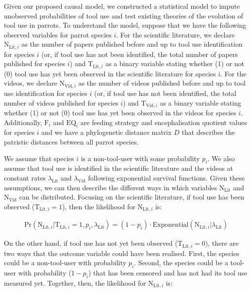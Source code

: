 \documentclass[
  man, donotrepeattitle,floatsintext]{apa6}
\begin{document}
Given our proposed causal model, we constructed a statistical model to impute
unobserved probabilities of tool use and test existing theories of the evolution
of tool use in parrots. To understand the model, suppose that we have the
following observed variables for parrot species \(i\). For the scientific
literature, we declare \(\text{N}_{\text{Lit},i}\) as the number of papers
published before and up to tool use identification for species \(i\) (or, if tool
use has not been identified, the total number of papers published for species
\(i\)) and \(\text{T}_{\text{Lit},i}\) as a binary variable stating whether (1) or
not (0) tool use has yet been observed in the scientific literature for species
\(i\). For the videos, we declare \(\text{N}_{\text{Vid},i}\) as the
number of videos published before and up to tool use identification for species
\(i\) (or, if tool use has not been identified, the total number of videos
published for species \(i\)) and \(\text{T}_{\text{Vid},i}\) as a binary variable
stating whether (1) or not (0) tool use has yet been observed in the
videos for species \(i\). Additionally, \(\text{F}_i\) and
\(\text{EQ}_i\) are feeding strategy and encephalisation quotient values for
species \(i\) and we have a phylogenetic distance matrix \(D\) that describes the
patristic distances between all parrot species.

We assume that species \(i\) is a non-tool-user with some
probability \(p_i\). We also assume that tool use is identified in the scientific
literature and the videos at constant rates \(\lambda_{\text{Lit}}\)
and \(\lambda_{\text{Vid}}\) following exponential survival functions. Given these
assumptions, we can then describe the different ways in which variables
\(\text{N}_\text{Lit}\) and \(\text{N}_\text{Vid}\) can be distributed. Focusing on
the scientific literature, if tool use has been observed
(\(\text{T}_{\text{Lit},i} = 1\)), then the likelihood for
\(\text{N}_{\text{Lit},i}\) is:

\begin{align}
\text{Pr}(\text{N}_{\text{Lit},i}|\text{T}_{\text{Lit},i} = 1,p_i,\lambda_\text{Lit}) = (1-p_i)\cdot\text{Exponential}(\text{N}_{\text{Lit},i}|\lambda_\text{Lit})
\end{align}

On the other hand, if tool use has not yet been observed
(\(\text{T}_{\text{Lit},i} = 0\)), there are two ways that the outcome variable
could have been realised. First, the species could be a non-tool-user with
probability \(p_i\). Second, the species could be a tool-user with probability
(\(1 - p_i\)) that has been censored and has not had its tool use measured yet.
Together, then, the likelihood for \(\text{N}_{\text{Lit},i}\) is:
\end{document}
